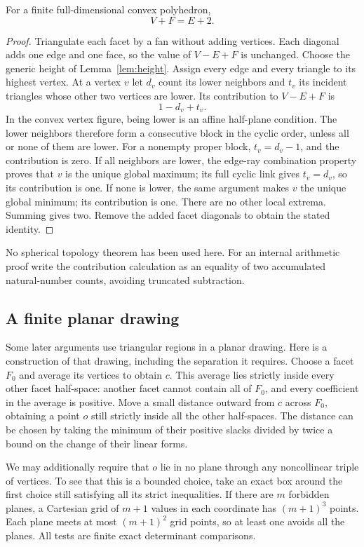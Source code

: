 \begin{lemma}\label{lem:euler}
For a finite full-dimensional convex polyhedron,
\[
 V+F=E+2.
\]
\end{lemma}
\begin{proof}
Triangulate each facet by a fan without adding vertices. Each diagonal
adds one edge and one face, so the value of $V-E+F$ is unchanged.
Choose the generic height of Lemma~\ref{lem:height}. Assign every edge
and every triangle to its highest vertex. At a vertex $v$ let $d_v$
count its lower neighbors and $t_v$ its incident triangles whose other
two vertices are lower. Its contribution to $V-E+F$ is
\[
 1-d_v+t_v.
\]
In the convex vertex figure, being lower is an affine half-plane
condition. The lower neighbors therefore form a consecutive block
in the cyclic order, unless all or none of them are lower. For a
nonempty proper block, $t_v=d_v-1$, and the contribution is zero.
If all neighbors are lower, the edge-ray combination property proves
that $v$ is the unique global maximum; its full cyclic link gives
$t_v=d_v$, so its contribution is one. If none is lower, the same
argument makes $v$ the unique global minimum; its contribution is one.
There are no other local extrema. Summing gives two. Remove the added
facet diagonals to obtain the stated identity.
\end{proof}

No spherical topology theorem has been used here. For an internal
arithmetic proof write the contribution calculation as an equality of
two accumulated natural-number counts, avoiding truncated subtraction.

\subsection{A finite planar drawing}

Some later arguments use triangular regions in a planar drawing.
Here is a construction of that drawing, including the separation it
requires. Choose a facet $F_0$ and average its vertices to obtain $c$.
This average lies strictly inside every other facet half-space: another
facet cannot contain all of $F_0$, and every coefficient in the average
is positive. Move a small distance outward from $c$ across $F_0$,
obtaining a point $o$ still strictly inside all the other half-spaces.
The distance can be chosen by taking the minimum of their positive
slacks divided by twice a bound on the change of their linear forms.

We may additionally require that $o$ lie in no plane through any
noncollinear triple of vertices. To see that this is a bounded choice,
take an exact box around the first choice still satisfying all its
strict inequalities. If there are $m$ forbidden planes, a Cartesian
grid of $m+1$ values in each coordinate has $(m+1)^3$ points. Each
plane meets at most $(m+1)^2$ grid points, so at least one avoids all
the planes. All tests are finite exact determinant comparisons.


